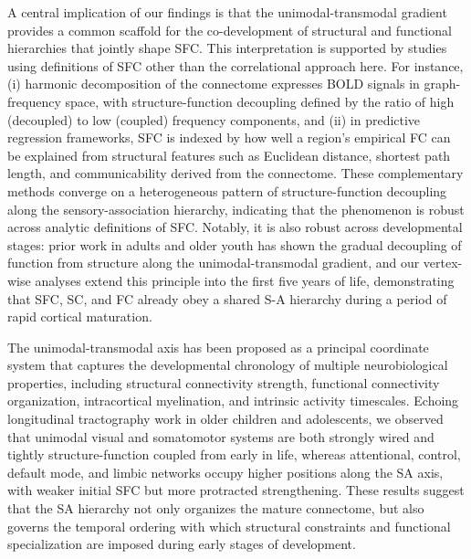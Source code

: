 A central implication of our findings is that the unimodal-transmodal gradient provides a common scaffold for the co-development of structural and functional hierarchies that jointly shape SFC. This interpretation is supported by studies using definitions of SFC other than the correlational approach here. For instance, (i) harmonic decomposition of the connectome expresses BOLD signals in graph-frequency space, with structure-function decoupling defined by the ratio of high (decoupled) to low (coupled) frequency components\cite{vazquez-rodriguezGradientsStructureFunction2019,liuTimeresolvedStructurefunctionCoupling2022}, and (ii) in predictive regression frameworks, SFC is indexed by how well a region's empirical FC can be explained from structural features such as Euclidean distance, shortest path length, and communicability derived from the connectome. These complementary methods converge on a heterogeneous pattern of structure-function decoupling along the sensory-association hierarchy, indicating that the phenomenon is robust across analytic definitions of SFC. Notably, it is also robust across developmental stages: prior work in adults and older youth has shown the gradual decoupling of function from structure along the unimodal-transmodal gradient\cite{marguliesSituatingDefaultmodeNetwork2016,fotiadisMyelinationExcitationinhibitionBalance2023,suarezLinkingStructureFunction2020a,guHeritabilityInterindividualVariability2021}, and our vertex-wise analyses extend this principle into the first five years of life, demonstrating that SFC, SC, and FC already obey a shared S-A hierarchy during a period of rapid cortical maturation.

The unimodal-transmodal axis has been proposed as a principal coordinate system that captures the developmental chronology of multiple neurobiological properties, including structural connectivity strength, functional connectivity organization, intracortical myelination, and intrinsic activity timescales\cite{sydnorNeurodevelopmentAssociationCortices2021,xuStructuralConnectivityMatures2024,fotiadisMyelinationExcitationinhibitionBalance2023}. Echoing longitudinal tractography work in older children and adolescents, we observed that unimodal visual and somatomotor systems are both strongly wired and tightly structure-function coupled from early in life, whereas attentional, control, default mode, and limbic networks occupy higher positions along the SA axis, with weaker initial SFC but more protracted strengthening\cite{lebelLongitudinalDevelopmentHuman2011}.  These results suggest that the SA hierarchy not only organizes the mature connectome, but also governs the temporal ordering with which structural constraints and functional specialization are imposed during early stages of development.

